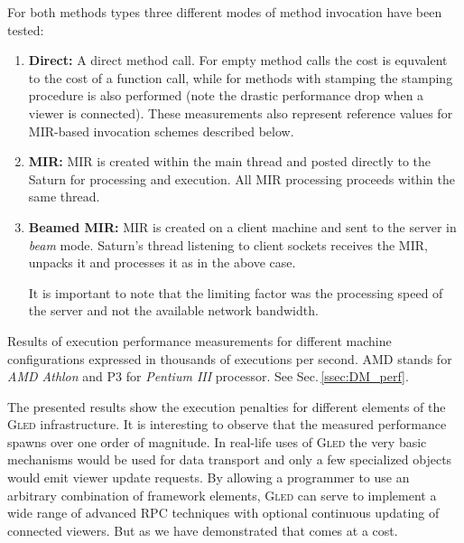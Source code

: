 \documentclass[a4paper,11pt]{article}
\def\gled{\textsc{Gled}\xspace}
\begin{document}
For both methods types three different modes of method invocation have
been tested:
\begin{enumerate}
  
\item \textbf{Direct:} A direct method call. For empty method calls
  the cost is equvalent to the cost of a function call, while for
  methods with stamping the stamping procedure is also performed (note
  the drastic performance drop when a viewer is connected). These
  measurements also represent reference values for MIR-based
  invocation schemes described below.
  
\item \textbf{MIR:} MIR is created within the main thread and
  posted directly to the Saturn for processing and execution. All
  MIR processing proceeds within the same thread.
  
\item \textbf{Beamed MIR:} MIR is created on a client machine and sent
  to the server in \emph{beam} mode. Saturn's thread listening to client
  sockets receives the MIR, unpacks it and processes it as in the
  above case.
  
  It is important to note that the limiting factor was the processing
  speed of the server and not the available network bandwidth.

\end{enumerate}

\begin{table}[htbp]
  \def\valerr#1#2{#1\,$\pm$\,#2}
  \footnotesize
  \centering
  
  \smallskip
  \caption{Results of execution performance measurements for different
    machine configurations expressed in thousands of executions per second.
    AMD stands for \emph{AMD Athlon} and P3 for \emph{Pentium III}
    processor. See Sec.\,\ref{ssec:DM_perf}.
    }
  \label{tab:MIRperf}
\end{table}

The presented results show the execution penalties for different
elements of the \gled infrastructure. It is interesting to observe
that the measured performance spawns over one order of magnitude. In
real-life uses of \gled the very basic mechanisms would be used for
data transport and only a few specialized objects would emit viewer
update requests. By allowing a programmer to use an arbitrary
combination of framework elements, \gled can serve to implement a wide
range of advanced RPC techniques with optional continuous updating of
connected viewers. But as we have demonstrated that comes at a cost.
\end{document}
